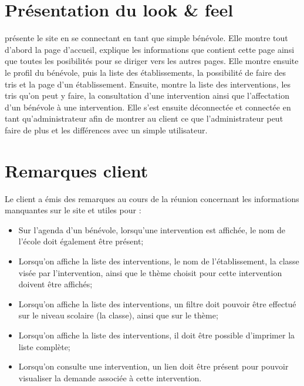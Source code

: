 \documentclass [a4paper] {article}
\begin{document}
\section{Présentation du look \& feel}
\Julie{} présente le site en se connectant en tant que simple bénévole. Elle montre tout d'abord la page d'accueil, explique les informations que contient cette page ainsi que toutes les posibilités pour se diriger vers les autres pages. Elle montre ensuite le profil du bénévole, puis la liste des établissements, la possibilité de faire des tris et la page d'un établissement. Ensuite, \Julie{} montre la liste des interventions, les tris qu'on peut y faire, la consultation d'une intervention ainsi que l'affectation d'un bénévole à une intervention. Elle s'est ensuite déconnectée et connectée en tant qu'administrateur afin de montrer au client ce que l'administrateur peut faire de plus et les différences avec un simple utilisateur. 

\section{Remarques client}
Le client a émis des remarques au cours de la réunion concernant les informations manquantes sur le site et utiles pour \nomClient: 
\begin{itemize}
\item Sur l'agenda d'un bénévole, lorsqu'une intervention est affichée, le nom de l'école doit également être présent;
\item Lorsqu'on affiche la liste des interventions, le nom de l'établissement, la classe visée par l'intervention, ainsi que le thème choisit pour cette intervention doivent être affichés;
\item Lorsqu'on affiche la liste des interventions, un filtre doit pouvoir être effectué sur le niveau scolaire (la classe), ainsi que sur le thème;
\item Lorsqu'on affiche la liste des interventions, il doit être possible d'imprimer la liste complète;
\item Lorsqu'on consulte une intervention, un lien doit être présent pour pouvoir visualiser la demande associée à cette intervention. 
\end{itemize}



\newpage
\end{document}
